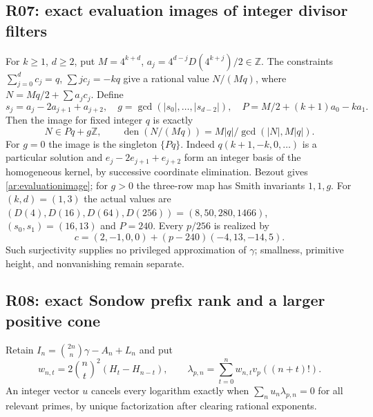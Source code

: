 \documentclass[11pt,a4paper]{article}
\newcommand{\Z}{\mathbb Z}
\theoremstyle{definition}
\theoremstyle{remark}
\numberwithin{equation}{section}
\begin{document}
\subsection{R07: exact evaluation images of integer divisor filters}
For $k\ge1$, $d\ge2$, put $M=4^{k+d}$,
$a_j=4^{d-j}D(4^{k+j})/2\in\Z$.  The constraints
$\sum_{j=0}^dc_j=q$, $\sum jc_j=-kq$ give a rational value $N/(Mq)$,
where $N=Mq/2+\sum a_jc_j$.  Define
\[
 s_j=a_j-2a_{j+1}+a_{j+2},\quad
 g=\gcd(|s_0|,\ldots,|s_{d-2}|),\quad
 P=M/2+(k+1)a_0-ka_1.
\]
Then the image for fixed integer $q$ is exactly
\begin{equation}\label{ar:evaluationimage}
 N\in Pq+g\Z,
 \qquad \operatorname{den}(N/(Mq))=M|q|/\gcd(|N|,M|q|).
\end{equation}
For $g=0$ the image is the singleton $\{Pq\}$.
Indeed $q(k+1,-k,0,\ldots)$ is a particular solution and
$e_j-2e_{j+1}+e_{j+2}$ form an integer basis of the homogeneous kernel,
by successive coordinate elimination.  Bezout gives \eqref{ar:evaluationimage};
for $g>0$ the three-row map has Smith invariants $1,1,g$.
For $(k,d)=(1,3)$ the actual values are
$(D(4),D(16),D(64),D(256))=(8,50,280,1466)$, $(s_0,s_1)=(16,13)$
and $P=240$.  Every $p/256$ is realized by
\[
 c=(2,-1,0,0)+(p-240)(-4,13,-14,5).
\]
Such surjectivity supplies no privileged approximation of $\gamma$;
smallness, primitive height, and nonvanishing remain separate.

\subsection{R08: exact Sondow prefix rank and a larger positive cone}
Retain $I_n=\binom{2n}{n}\gamma-A_n+L_n$ and put
\[
 w_{n,t}=2\binom nt^2(H_t-H_{n-t}),\qquad
 \lambda_{p,n}=\sum_{t=0}^nw_{n,t}v_p((n+t)!).
\]
An integer vector $u$ cancels every logarithm exactly when
$\sum_nu_n\lambda_{p,n}=0$ for all relevant primes, by unique
factorization after clearing rational exponents.
\end{document}
